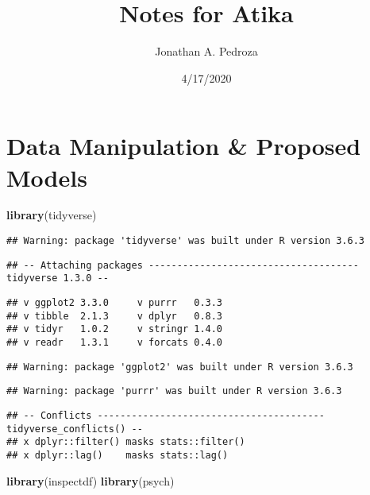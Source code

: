\documentclass[
]{article}
\title{Notes for Atika}
\author{Jonathan A. Pedroza}
\date{4/17/2020}
\newenvironment{Shaded}{\begin{snugshade}}{\end{snugshade}}
\newcommand{\KeywordTok}[1]{\textcolor[rgb]{0.13,0.29,0.53}{\textbf{#1}}}
\newcommand{\NormalTok}[1]{#1}
\begin{document}
\maketitle

\hypertarget{data-manipulation-proposed-models}{%
\section{Data Manipulation \& Proposed
Models}\label{data-manipulation-proposed-models}}

\begin{Shaded}
\begin{Highlighting}[]
\KeywordTok{library}\NormalTok{(tidyverse)}
\end{Highlighting}
\end{Shaded}

\begin{verbatim}
## Warning: package 'tidyverse' was built under R version 3.6.3
\end{verbatim}

\begin{verbatim}
## -- Attaching packages ------------------------------------- tidyverse 1.3.0 --
\end{verbatim}

\begin{verbatim}
## v ggplot2 3.3.0     v purrr   0.3.3
## v tibble  2.1.3     v dplyr   0.8.3
## v tidyr   1.0.2     v stringr 1.4.0
## v readr   1.3.1     v forcats 0.4.0
\end{verbatim}

\begin{verbatim}
## Warning: package 'ggplot2' was built under R version 3.6.3
\end{verbatim}

\begin{verbatim}
## Warning: package 'purrr' was built under R version 3.6.3
\end{verbatim}

\begin{verbatim}
## -- Conflicts ---------------------------------------- tidyverse_conflicts() --
## x dplyr::filter() masks stats::filter()
## x dplyr::lag()    masks stats::lag()
\end{verbatim}

\begin{Shaded}
\begin{Highlighting}[]
\KeywordTok{library}\NormalTok{(inspectdf)}
\KeywordTok{library}\NormalTok{(psych)}
\end{Highlighting}
\end{Shaded}
\end{document}
